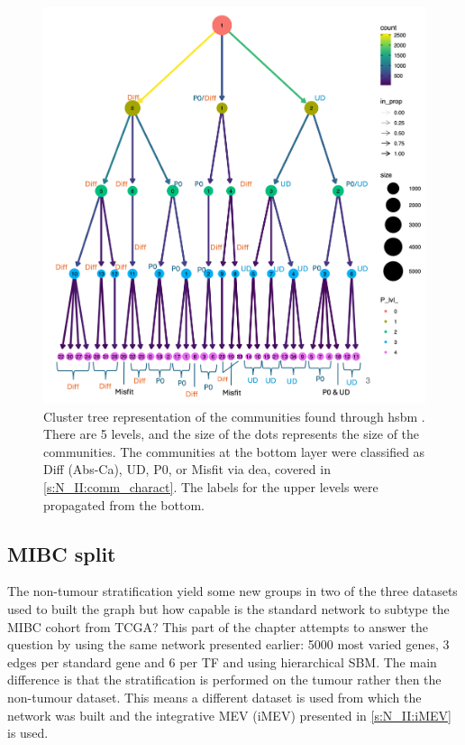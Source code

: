 \begin{figure}[H]    
    \centering
    \includegraphics[width=1.0\textwidth,height=1.0\textheight,keepaspectratio]{Sections/Network_II/resources/non_tum/clustertree_labels.png}
    \caption{Cluster tree representation of the communities found through \acrfull{hsbm} \citet{Peixoto2014-yb}. There are 5 levels, and the size of the dots represents the size of the communities. The communities at the bottom layer were classified as Diff (Abs-Ca), UD, P0, or Misfit via \acrfull{dea}, covered in \cref{s:N_II:comm_charact}. The labels for the upper levels were propagated from the bottom.}
    \label{fig:N_II:cluster_tree}
\end{figure}



% 
\subsection{MIBC split} \label{s:N_II:tum_split}

The non-tumour stratification yield some new groups in two of the three datasets used to built the graph but how capable is the standard network to subtype the MIBC cohort from TCGA? This part of the chapter attempts to answer the question by using the same network presented earlier: 5000 most varied genes, 3 edges per standard gene and 6 per TF and using hierarchical SBM. The main difference is that the stratification is performed on the tumour rather then the non-tumour dataset. This means a different dataset is used from which the network was built and the integrative MEV (iMEV) presented in \cref{s:N_II:iMEV} is used.

